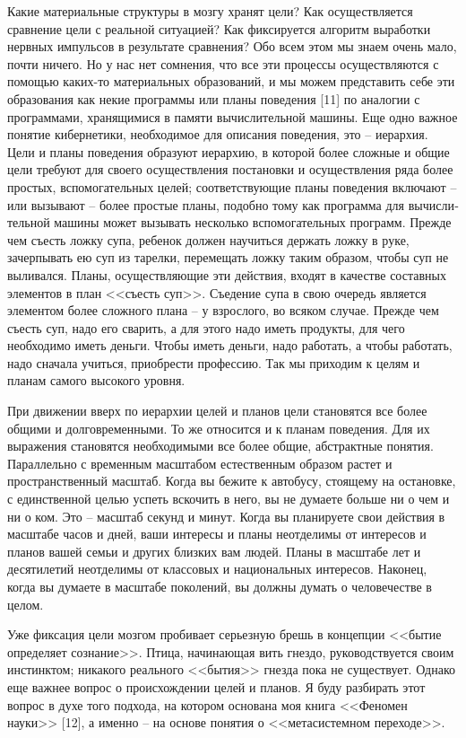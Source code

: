 \documentclass{book}
\begin{document}
Какие материальные структуры в мозгу хранят цели? Как осуществляется сравнение цели с реальной ситуацией? Как фиксируется 
алгоритм выработки нервных импульсов в результате сравнения? Обо всем этом мы знаем очень мало, почти ничего. Но у нас нет 
сомнения, что все эти процессы осуществляются с помощью каких-то материальных образований, и мы можем представить себе эти 
образования как некие програм­мы или планы  поведения [11] по аналогии с программами, хра­нящимися в памяти вычислительной машины.
Еще одно важное понятие кибернетики, необходимое для описания поведения, это -- иерархия.  Цели и планы поведения образуют 
иерархию, в которой более сложные и общие цели требуют для своего осуществления постановки и осуществле­ния ряда более простых, 
вспомогательных целей; соответству­ющие планы поведения включают -- или вызывают -- более простые планы, подобно тому как 
программа для вычисли­тельной машины может вызывать несколько вспомогательных программ. Прежде чем съесть ложку супа, ребенок 
должен научиться держать ложку в руке, зачерпывать ею суп из тарел­ки, перемещать ложку таким образом, чтобы суп не выливался. 
Планы, осуществляющие эти действия, входят в качестве состав­ных элементов в план <<съесть суп>>. Съедение супа в свою оче­редь 
является элементом более сложного плана -- у взрослого, во всяком случае. Прежде чем съесть суп, надо его сварить, а для этого 
надо иметь продукты, для чего необходимо иметь деньги. Чтобы иметь деньги, надо работать, а чтобы работать, надо сначала 
учиться, приобрести профессию. Так мы приходим к целям и планам самого высокого уровня.

При движении вверх по иерархии целей и планов цели становятся все более общими и долговременными. То же относится и к планам 
поведения. Для их выражения становятся необходимыми все более общие, абстрактные понятия. Параллельно с временным масштабом 
естественным образом растет и пространственный масштаб. Когда вы бежите к автобусу, стоящему на остановке, с единственной целью 
успеть вскочить в него, вы не думаете больше ни о чем и ни о ком. Это -- масштаб секунд и минут. Когда вы планируете свои 
действия в масштабе часов и дней, ваши интересы и планы неотделимы от инте­ресов и планов вашей семьи и других близких вам людей. 
Пла­ны в масштабе лет и десятилетий неотделимы от классовых и национальных интересов. Наконец, когда вы думаете в масш­табе 
поколений, вы должны думать о человечестве в целом.

Уже фиксация цели мозгом пробивает серьезную брешь в концепции <<бытие определяет сознание>>. Птица, начинающая вить гнездо, 
руководствуется своим инстинктом; никакого реального <<бытия>> гнезда пока не существует. Однако еще важнее вопрос о происхождении целей и планов. Я буду раз­бирать этот вопрос в духе того подхода, на котором основана моя книга <<Феномен науки>> [12], а именно -- на основе понятия о <<метасистемном переходе>>.
\end{document}
